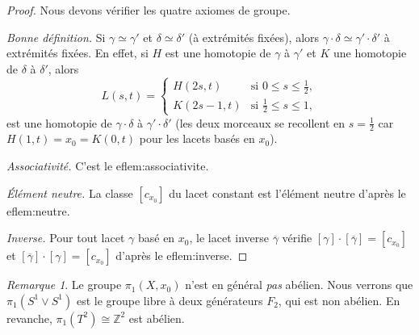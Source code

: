 \documentclass[12pt,a4paper,openany]{book}
\theoremstyle{definition}
\theoremstyle{plain}
\theoremstyle{remark}
\newtheorem{remarque}[definition]{Remarque}
\newcommand{\Z}{\mathbb{Z}}
\begin{document}
\begin{proof}
Nous devons vérifier les quatre axiomes de groupe.

\emph{Bonne définition.} Si $\gamma \simeq \gamma'$ et $\delta \simeq \delta'$
(à extrémités fixées), alors $\gamma \cdot \delta \simeq \gamma' \cdot \delta'$
à extrémités fixées. En effet, si $H$ est une homotopie de $\gamma$ à $\gamma'$
et $K$ une homotopie de $\delta$ à $\delta'$, alors
\[
L(s,t) = \begin{cases}
H(2s, t) & \text{si } 0 \leqslant s \leqslant \tfrac{1}{2}, \\
K(2s-1, t) & \text{si } \tfrac{1}{2} \leqslant s \leqslant 1,
\end{cases}
\]
est une homotopie de $\gamma \cdot \delta$ à $\gamma' \cdot \delta'$ (les deux
morceaux se recollent en $s = \tfrac{1}{2}$ car $H(1,t) = x_0 = K(0,t)$ pour
les lacets basés en $x_0$).

\emph{Associativité.} C'est le 
ef{lem:associativite}.

\emph{Élément neutre.} La classe $[c_{x_0}]$ du lacet constant est l'élément
neutre d'après le 
ef{lem:neutre}.

\emph{Inverse.} Pour tout lacet $\gamma$ basé en $x_0$, le lacet inverse
$\overline{\gamma}$ vérifie $[\gamma] \cdot [\overline{\gamma}] = [c_{x_0}]$ et
$[\overline{\gamma}] \cdot [\gamma] = [c_{x_0}]$ d'après le 
ef{lem:inverse}.
\end{proof}

\begin{remarque}\label{rem:pi1-non-abelien}
Le groupe $\pi_1(X, x_0)$ n'est en général \emph{pas} abélien. Nous verrons que
$\pi_1(S^1 \vee S^1)$ est le groupe libre à deux générateurs $F_2$, qui est non
abélien. En revanche, $\pi_1(T^2) \cong \Z^2$ est abélien.
\end{remarque}
\end{document}
